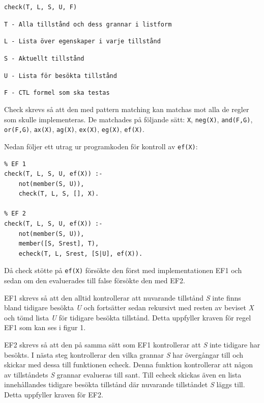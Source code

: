 \begin{center}
\begin{minipage}{0.75\textwidth}
\texttt{check(T, L, S, U, F)}

\texttt{T - Alla tillstånd och dess grannar i listform}

\texttt{L - Lista över egenskaper i varje tillstånd}

\texttt{S - Aktuellt tillstånd}

\texttt{U - Lista för besökta tillstånd}

\texttt{F - CTL formel som ska testas}

\end{minipage}
\end{center}

Check skrevs så att den med pattern matching kan matchas mot alla de regler som skulle implementeras. De matchades på följande sätt: \texttt{X}, \texttt{neg(X)}, \texttt{and(F,G)}, \texttt{or(F,G)}, \texttt{ax(X)}, \texttt{ag(X)}, \texttt{ex(X)}, \texttt{eg(X)}, \texttt{ef(X)}.

Nedan följer ett utrag ur programkoden för kontroll av \texttt{ef(X)}:

\begin{center}
\begin{minipage}{0.6\textwidth}

\begin{lstlisting}
% EF 1
check(T, L, S, U, ef(X)) :-
	not(member(S, U)),
	check(T, L, S, [], X).

% EF 2
check(T, L, S, U, ef(X)) :-
	not(member(S, U)),
	member([S, Srest], T),
	echeck(T, L, Srest, [S|U], ef(X)).
\end{lstlisting}
\end{minipage}
\end{center}

Då check stötte på \texttt{ef(X)} försökte den först med implementationen EF1 och
sedan om den evaluerades till false försökte den med EF2.

EF1 skrevs så att den alltid kontrollerar att nuvarande tillstånd \textit{S} inte finns bland tidigare besökta \textit{U} och fortsätter sedan rekursivt med resten av beviset \textit{X} och tömd lista \textit{U} för tidigare besökta tillstånd. Detta uppfyller kraven för regel EF1 som kan ses i figur 1.

EF2 skrevs så att den på samma sätt som EF1 kontrollerar att \textit{S} inte
tidigare har besökts. I nästa steg kontrollerar den vilka grannar \textit{S} har
övergångar till och skickar med dessa till funktionen echeck. Denna funktion kontrollerar att
någon av tillståndets \textit{S} grannar evalueras till sant. Till echeck skickas även en lista innehållandes tidigare besökta tillstånd där nuvarande tillståndet \textit{S} läggs till. Detta uppfyller
kraven för EF2.

